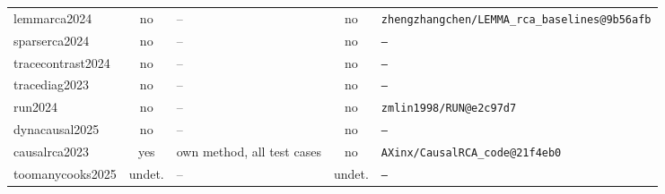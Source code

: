\begin{longtable}{lcp{2.7cm}cp{7.3cm}}
lemmarca2024 & no & -- & no & \texttt{\scriptsize zhengzhangchen/LEMMA\_rca\_baselines@9b56afb} \\
sparserca2024 & no & -- & no & \texttt{\scriptsize --} \\
tracecontrast2024 & no & -- & no & \texttt{\scriptsize --} \\
tracediag2023 & no & -- & no & \texttt{\scriptsize --} \\
run2024 & no & -- & no & \texttt{\scriptsize zmlin1998/RUN@e2c97d7} \\
dynacausal2025 & no & -- & no & \texttt{\scriptsize --} \\
causalrca2023 & yes & own method, all test cases & no & \texttt{\scriptsize AXinx/CausalRCA\_code@21f4eb0} \\
toomanycooks2025 & undet. & -- & undet. & \texttt{\scriptsize --} \\
\bottomrule
\end{longtable}
